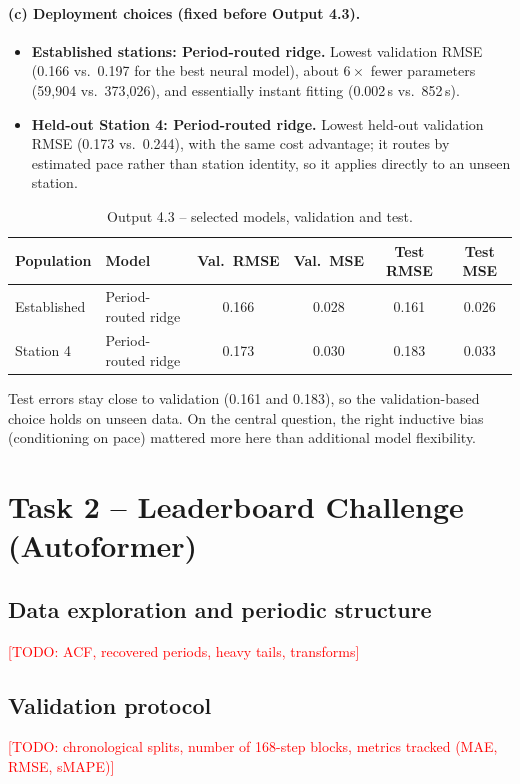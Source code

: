 \documentclass[11pt,a4paper]{article}
\newcommand{\todo}[1]{\textcolor{red}{[TODO: #1]}}
\begin{document}
\paragraph{(c) Deployment choices (fixed before Output 4.3).}
\begin{itemize}
  \item \textbf{Established stations: Period-routed ridge.} Lowest validation RMSE (0.166 vs.\ 0.197 for the best neural model), about $6\times$ fewer parameters (59{,}904 vs.\ 373{,}026), and essentially instant fitting (0.002\,s vs.\ 852\,s).
  \item \textbf{Held-out Station 4: Period-routed ridge.} Lowest held-out validation RMSE (0.173 vs.\ 0.244), with the same cost advantage; it routes by estimated pace rather than station identity, so it applies directly to an unseen station.
\end{itemize}
\begin{table}[H]\centering\small
\caption{Output 4.3 -- selected models, validation and test.}
\label{tab:out43}
\begin{tabular}{llcccc}
\toprule
Population & Model & Val.\ RMSE & Val.\ MSE & Test RMSE & Test MSE\\
\midrule
Established & Period-routed ridge & 0.166 & 0.028 & 0.161 & 0.026\\
Station 4 & Period-routed ridge & 0.173 & 0.030 & 0.183 & 0.033\\
\bottomrule
\end{tabular}
\end{table}
\noindent Test errors stay close to validation (0.161 and 0.183), so the validation-based choice holds on unseen data. On the central question, the right inductive bias (conditioning on pace) mattered more here than additional model flexibility.

\clearpage
\section*{Task 2 -- Leaderboard Challenge (Autoformer)}

\subsection*{Data exploration and periodic structure}
\todo{ACF, recovered periods, heavy tails, transforms}

\subsection*{Validation protocol}
\todo{chronological splits, number of 168-step blocks, metrics tracked (MAE, RMSE, sMAPE)}
\end{document}
